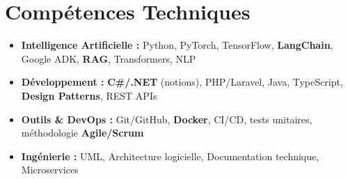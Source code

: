 ﻿\documentclass[a4paper,11pt]{article}
\begin{document}
\section{Compétences Techniques}
\begin{itemize}[leftmargin=*, nosep]
    \item \small{\textbf{Intelligence Artificielle :} Python, PyTorch, TensorFlow, \textbf{LangChain}, Google ADK, \textbf{RAG}, Transformers, NLP}
    \item \small{\textbf{Développement :} \textbf{C\#/.NET} (notions), PHP/Laravel, Java, TypeScript, \textbf{Design Patterns}, REST APIs}
    \item \small{\textbf{Outils \& DevOps :} Git/GitHub, \textbf{Docker}, CI/CD, tests unitaires, méthodologie \textbf{Agile/Scrum}}
    \item \small{\textbf{Ingénierie :} UML, Architecture logicielle, Documentation technique, Microservices}
\end{itemize}

\end{document}
